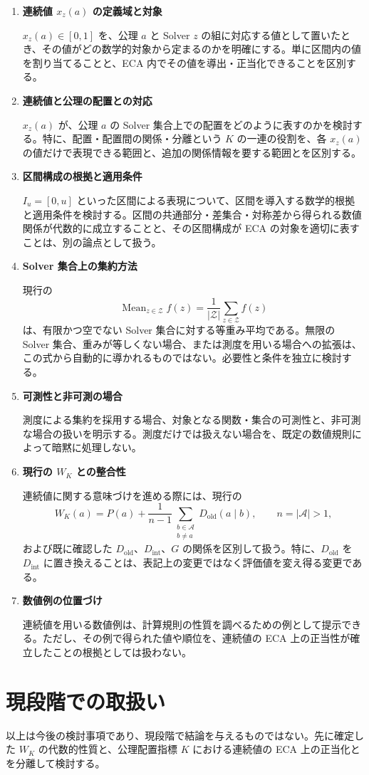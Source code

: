 \documentclass[a4paper,11pt]{article}
\begin{document}
\begin{enumerate}
  \item \textbf{連続値 $x_z(a)$ の定義域と対象}\par
  $x_z(a)\in[0,1]$ を、公理 $a$ と Solver $z$ の組に対応する値として置いたとき、その値がどの数学的対象から定まるのかを明確にする。単に区間内の値を割り当てることと、ECA 内でその値を導出・正当化できることを区別する。

  \item \textbf{連続値と公理の配置との対応}\par
  $x_z(a)$ が、公理 $a$ の Solver 集合上での配置をどのように表すのかを検討する。特に、配置・配置間の関係・分離という $K$ の一連の役割を、各 $x_z(a)$ の値だけで表現できる範囲と、追加の関係情報を要する範囲とを区別する。

  \item \textbf{区間構成の根拠と適用条件}\par
  $I_u=[0,u]$ といった区間による表現について、区間を導入する数学的根拠と適用条件を検討する。区間の共通部分・差集合・対称差から得られる数値関係が代数的に成立することと、その区間構成が ECA の対象を適切に表すことは、別の論点として扱う。

  \item \textbf{Solver 集合上の集約方法}\par
  現行の
  \[
    \operatorname{Mean}_{z\in\mathcal{Z}} f(z)
    =\frac{1}{|\mathcal{Z}|}\sum_{z\in\mathcal{Z}}f(z)
  \]
  は、有限かつ空でない Solver 集合に対する等重み平均である。無限の Solver 集合、重みが等しくない場合、または測度を用いる場合への拡張は、この式から自動的に導かれるものではない。必要性と条件を独立に検討する。

  \item \textbf{可測性と非可測の場合}\par
  測度による集約を採用する場合、対象となる関数・集合の可測性と、非可測な場合の扱いを明示する。測度だけでは扱えない場合を、既定の数値規則によって暗黙に処理しない。

  \item \textbf{現行の $W_K$ との整合性}\par
  連続値に関する意味づけを進める際には、現行の
  \[
    W_K(a)=P(a)+\frac{1}{n-1}
    \sum_{\substack{b\in\mathcal{A}\\b\ne a}}
    D_{\mathrm{old}}(a\mid b),\qquad n=|\mathcal{A}|>1,
  \]
  および既に確認した $D_{\mathrm{old}}$、$D_{\mathrm{int}}$、$G$ の関係を区別して扱う。特に、$D_{\mathrm{old}}$ を $D_{\mathrm{int}}$ に置き換えることは、表記上の変更ではなく評価値を変え得る変更である。

  \item \textbf{数値例の位置づけ}\par
  連続値を用いる数値例は、計算規則の性質を調べるための例として提示できる。ただし、その例で得られた値や順位を、連続値の ECA 上の正当性が確立したことの根拠としては扱わない。
\end{enumerate}

\section{現段階での取扱い}

以上は今後の検討事項であり、現段階で結論を与えるものではない。先に確定した $W_K$ の代数的性質と、公理配置指標 $K$ における連続値の ECA 上の正当化とを分離して検討する。
\end{document}
